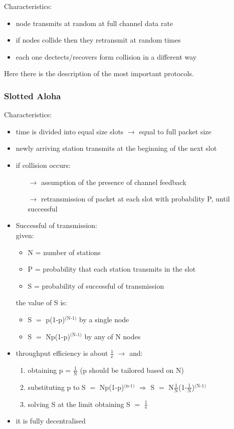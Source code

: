 Characteristics:
\begin{itemize}
    \item node transmits at random at full channel data rate
    \item if nodes collide then they retransmit at random times
    \item each one dectects/recovers form collision in a different way
\end{itemize}
\vspace*{0.5cm}
Here there is the description of the most important protocols.

\subsubsection{Slotted Aloha}

Characteristics:
\begin{itemize}
    \item time is divided into equal size slots $\rightarrow$ equal to full packet size
    \item newly arriving station transmits at the beginning of the next slot
    \item if collision occurs:
    \begin{itemize}
        \item[$\rightarrow$] assumption of the presence of channel feedback
        \item[$\rightarrow$] retransmission of packet at each slot with probability P, until successful
        \end{itemize}
        \item Successful of transmission:\\[0.2cm]given:
        \begin{itemize}
            \item N = number of stations
            \item P = probability that each station transmits in the slot
            \item S = probability of successful of transmission
        \end{itemize}
        the value of S is:
        \begin{itemize}
            \item S $=$ p(1-p)$^{\text{(N-1)}}$ by a single node 
            \item S $=$ Np(1-p)$^{\text{(N-1)}}$ by any of N nodes
        \end{itemize}
    \item throughput efficiency is about $\frac{\text{1}}{\text{e}}$ $\rightarrow$
    and:
    \begin{enumerate}
        \item obtaining p = $\frac{\text{1}}{\text{N}}$ (p should be tailored based on N)
        \item substituting p to S $=$ Np(1-p)$^{\text{(n-1)}}$ $\Rightarrow$
        S $=$ N$\frac{\text{1}}{\text{N}}$(1-$\frac{\text{1}}{\text{N}}$)$^{\text{(N-1)}}$
        \item solving S at the limit obtaining S $=$ $\frac{\text{1}}{\text{e}}$
    \end{enumerate}
    \item it is fully decentralised
\end{itemize}
